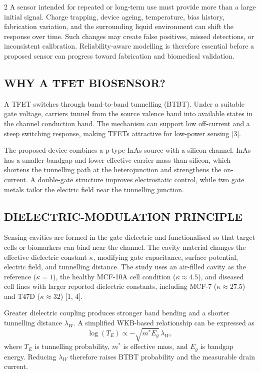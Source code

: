 \begin{multicols}{2}
  \noindent
  A sensor intended for repeated or long-term use must provide more than a large initial signal. Charge trapping, device ageing, temperature, bias history, fabrication variation, and the surrounding liquid environment can shift the response over time. Such changes may create false positives, missed detections, or inconsistent calibration. Reliability-aware modelling is therefore essential before a proposed sensor can progress toward fabrication and biomedical validation.

  \subsection*{\centering\uppercase{Why a TFET Biosensor?}}
  A TFET switches through band-to-band tunnelling (BTBT). Under a suitable gate voltage, carriers tunnel from the source valence band into available states in the channel conduction band. The mechanism can support low off-current and a steep switching response, making TFETs attractive for low-power sensing [3].

  \noindent
  The proposed device combines a p-type InAs source with a silicon channel. InAs has a smaller bandgap and lower effective carrier mass than silicon, which shortens the tunnelling path at the heterojunction and strengthens the on-current. A double-gate structure improves electrostatic control, while two gate metals tailor the electric field near the tunnelling junction.

  \subsection*{\centering\uppercase{Dielectric-Modulation Principle}}
  Sensing cavities are formed in the gate dielectric and functionalised so that target cells or biomarkers can bind near the channel. The cavity material changes the effective dielectric constant $\kappa$, modifying gate capacitance, surface potential, electric field, and tunnelling distance. The study uses an air-filled cavity as the reference ($\kappa=1$), the healthy MCF-10A cell condition ($\kappa\approx4.5$), and diseased cell lines with larger reported dielectric constants, including MCF-7 ($\kappa\approx27.5$) and T47D ($\kappa\approx32$) [1, 4].

  \noindent
  Greater dielectric coupling produces stronger band bending and a shorter tunnelling distance $\lambda_W$. A simplified WKB-based relationship can be expressed as
  \[
    \log(T_E)\propto-\sqrt{m^*E_g}\,\lambda_W,
  \]
  where $T_E$ is tunnelling probability, $m^*$ is effective mass, and $E_g$ is bandgap energy. Reducing $\lambda_W$ therefore raises BTBT probability and the measurable drain current.


\end{multicols}
